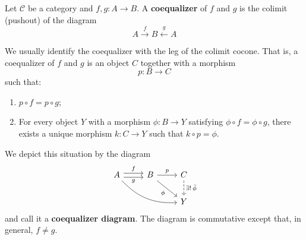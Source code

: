 \documentclass[12pt, oneside]{book}
\begin{document}
\begin{definition}
    Let $\mathcal{C}$ be a category and $f,g: A \to B$.
    A \textbf{coequalizer} of $f$ and $g$ is the colimit (pushout) of the diagram
    \begin{equation*}
        A\xrightarrow{f} B \xleftarrow{g} A
    \end{equation*}
    \begin{remark}
        We usually identify the coequalizer with the leg of the colimit cocone. That is, a coequalizer of $f$ and $g$ is an object $C$ together with a morphism
        \begin{equation*}
            p : B \to C
        \end{equation*}
        such that:
        \begin{enumerate}[label=(\roman*)]
            \item
                  $p \circ f = p \circ g$;
            \item
                  For every object $Y$ with a morphism $\phi : B \to Y$ satisfying $\phi \circ f = \phi \circ g$,
                  there exists a unique morphism $k : C \to Y$ such that $k \circ p = \phi$.
        \end{enumerate}
        We depict this situation by the diagram
        \begin{equation*}
            \begin{tikzcd}
                A \arrow[rrd,bend right=25,""]\arrow[r, shift left, "f"] \arrow[r, shift right, swap, "g"] & B \arrow[r, "p"] \arrow[rd, "\phi"'] & C \arrow[d, dashed, "\exists!\, \bar{\phi}"] \\
                & & Y
            \end{tikzcd}
        \end{equation*}
        and call it a \textbf{coequalizer diagram}.
        The diagram is commutative except that, in general, $f \neq g$.
    \end{remark}
\end{definition}
\end{document}
